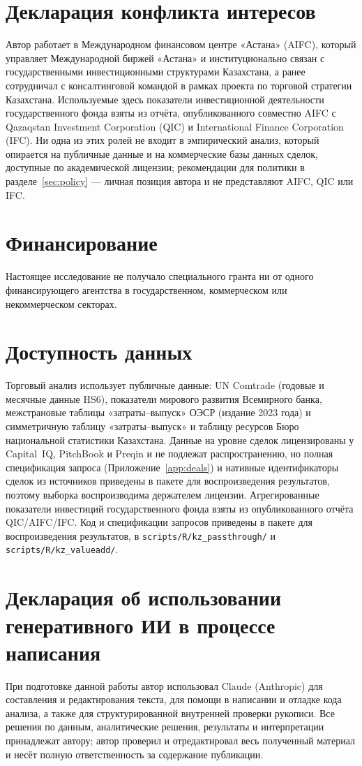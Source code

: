 \documentclass[12pt]{article}
\begin{document}
\section*{Декларация конфликта интересов}
Автор работает в Международном финансовом центре «Астана» (AIFC), который управляет
Международной биржей «Астана» и институционально связан с государственными
инвестиционными структурами Казахстана, а ранее сотрудничал с консалтинговой командой в
рамках проекта по торговой стратегии Казахстана. Используемые здесь показатели
инвестиционной деятельности государственного фонда взяты из отчёта, опубликованного
совместно AIFC с Qazaqstan Investment Corporation (QIC) и International Finance Corporation
(IFC). Ни одна из этих ролей не входит в эмпирический анализ, который опирается на
публичные данные и на коммерческие базы данных сделок, доступные по академической
лицензии; рекомендации для политики в разделе~\ref{sec:policy} — личная позиция автора и не
представляют AIFC, QIC или IFC.

\section*{Финансирование}
Настоящее исследование не получало специального гранта ни от одного финансирующего
агентства в государственном, коммерческом или некоммерческом секторах.

\section*{Доступность данных}
Торговый анализ использует публичные данные: UN Comtrade (годовые и месячные данные HS6),
показатели мирового развития Всемирного банка, межстрановые таблицы «затраты--выпуск» ОЭСР
(издание 2023 года) и симметричную таблицу «затраты--выпуск» и таблицу ресурсов Бюро
национальной статистики Казахстана. Данные на уровне сделок лицензированы у Capital~IQ,
PitchBook и Preqin и не подлежат распространению, но полная спецификация запроса
(Приложение~\ref{app:deals}) и нативные идентификаторы сделок из источников приведены в
пакете для воспроизведения результатов, поэтому выборка воспроизводима держателем лицензии.
Агрегированные показатели инвестиций государственного фонда взяты из опубликованного отчёта
QIC/AIFC/IFC. Код и спецификации запросов приведены в пакете для воспроизведения
результатов, в \texttt{scripts/R/}\allowbreak\texttt{kz\_passthrough/} и
\texttt{scripts/R/}\allowbreak\texttt{kz\_valueadd/}.

\section*{Декларация об использовании генеративного ИИ в процессе написания}
При подготовке данной работы автор использовал Claude (Anthropic) для составления и
редактирования текста, для помощи в написании и отладке кода анализа, а также для
структурированной внутренней проверки рукописи. Все решения по данным, аналитические
решения, результаты и интерпретации принадлежат автору; автор проверил и отредактировал
весь полученный материал и несёт полную ответственность за содержание публикации.
\end{document}
